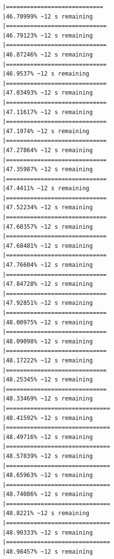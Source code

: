 \documentclass{article}\usepackage[]{graphicx}\usepackage[]{xcolor}
\makeatletter
\newenvironment{kframe}{%
 \def\at@end@of@kframe{}%
 \ifinner\ifhmode%
  \def\at@end@of@kframe{\end{minipage}}%
  \begin{minipage}{\columnwidth}%
 \fi\fi%
 \def\FrameCommand##1{\hskip\@totalleftmargin \hskip-\fboxsep
 \colorbox{shadecolor}{##1}\hskip-\fboxsep
     \hskip-\linewidth \hskip-\@totalleftmargin \hskip\columnwidth}%
 \MakeFramed {\advance\hsize-\width
   \@totalleftmargin\z@ \linewidth\hsize
   \@setminipage}}%
 {\par\unskip\endMakeFramed%
 \at@end@of@kframe}
\newenvironment{knitrout}{}{} %
\makeatother
\begin{document}
\begin{knitrout}
\begin{kframe}
\begin{verbatim}
|============================                                  |46.70999% ~12 s remaining 
|=============================                                 |46.79123% ~12 s remaining 
|=============================                                 |46.87246% ~12 s remaining 
|=============================                                 |46.9537% ~12 s remaining  
|=============================                                 |47.03493% ~12 s remaining 
|=============================                                 |47.11617% ~12 s remaining 
|=============================                                 |47.1974% ~12 s remaining  
|=============================                                 |47.27864% ~12 s remaining 
|=============================                                 |47.35987% ~12 s remaining 
|=============================                                 |47.4411% ~12 s remaining  
|=============================                                 |47.52234% ~12 s remaining 
|=============================                                 |47.60357% ~12 s remaining 
|=============================                                 |47.68481% ~12 s remaining 
|=============================                                 |47.76604% ~12 s remaining 
|=============================                                 |47.84728% ~12 s remaining 
|=============================                                 |47.92851% ~12 s remaining 
|=============================                                 |48.00975% ~12 s remaining 
|=============================                                 |48.09098% ~12 s remaining 
|=============================                                 |48.17222% ~12 s remaining 
|=============================                                 |48.25345% ~12 s remaining 
|=============================                                 |48.33469% ~12 s remaining 
|==============================                                |48.41592% ~12 s remaining 
|==============================                                |48.49716% ~12 s remaining 
|==============================                                |48.57839% ~12 s remaining 
|==============================                                |48.65963% ~12 s remaining 
|==============================                                |48.74086% ~12 s remaining 
|==============================                                |48.8221% ~12 s remaining  
|==============================                                |48.90333% ~12 s remaining 
|==============================                                |48.98457% ~12 s remaining 

\end{verbatim}
\end{kframe}
\end{knitrout}
\end{document}
